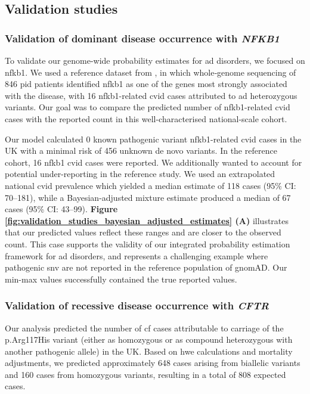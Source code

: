 \FloatBarrier
\subsection{Validation studies}
\subsubsection{Validation of dominant disease occurrence with \textit{NFKB1}}

To validate our genome-wide probability estimates for \ac{ad} disorders, we focused on \ac{nfkb1}.
We used a reference dataset from \citet{tuijnenburgNFKB12018}, in which whole‐genome sequencing of 846 \ac{pid} patients identified \ac{nfkb1} as one of the genes most strongly associated with the disease, with 16 \ac{nfkb1}-related \ac{cvid} cases attributed to \ac{ad} heterozygous variants. 
Our goal was to compare the predicted number of \ac{nfkb1}-related \ac{cvid} cases with the reported count in this well-characterised national-scale cohort.

Our model calculated 0 known pathogenic variant \ac{nfkb1}-related \ac{cvid} cases in the UK with a minimal risk of 456 unknown de novo variants. In the reference cohort, 16 \ac{nfkb1} \ac{cvid} cases were reported. 
We additionally wanted to account for potential under-reporting in the reference study. 
We used an extrapolated national \ac{cvid} prevalence which yielded a median estimate of 118 cases (95\% CI: 70–181), while a Bayesian-adjusted mixture estimate produced a median of 67 cases (95\% CI: 43–99). \textbf{Figure \ref{fig:validation_studies_bayesian_adjusted_estimates} (A)} illustrates that our predicted values reflect these ranges and are closer to the observed count. 
This case supports the validity of our integrated probability estimation framework for \ac{ad} disorders, and represents a challenging example where pathogenic \ac{snv} are not reported in the reference population of gnomAD. Our min-max values successfully contained the true reported values.


\subsubsection{Validation of recessive disease occurrence with \textit{CFTR}}

Our analysis predicted the number of \ac{cf} cases attributable to carriage of the p.Arg117His variant (either as homozygous or as compound heterozygous with another pathogenic allele) in the UK. Based on \ac{hwe} calculations and mortality adjustments, we predicted approximately 648 cases arising from biallelic variants and 160 cases from homozygous variants, resulting in a total of 808 expected cases.

